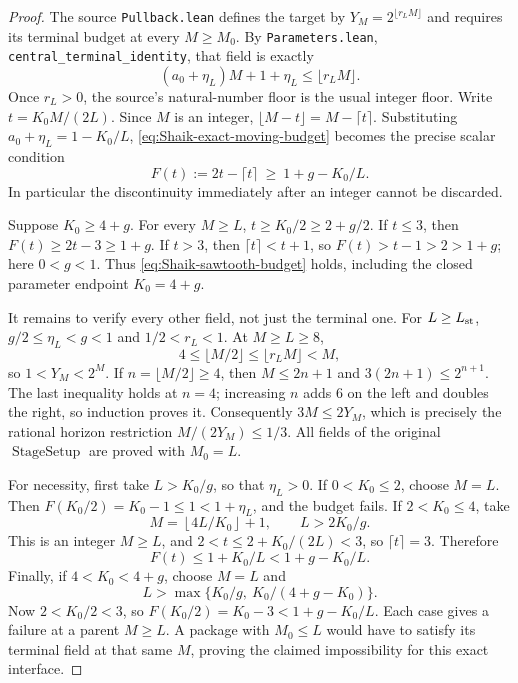 \begin{proof}
The source \texttt{Pullback.lean} defines the target by
\(Y_M=2^{\lfloor r_LM\rfloor}\) and requires its terminal budget
at every \(M\ge M_0\). By \texttt{Parameters.lean},
\texttt{central\_terminal\_identity}, that field is exactly
\begin{equation}\label{eq:Shaik-exact-moving-budget}
 (a_0+\eta_L)M+1+\eta_L\le\lfloor r_LM\rfloor .
\end{equation}
Once \(r_L>0\), the source's natural-number floor is the usual
integer floor. Write \(t=K_0M/(2L)\). Since \(M\) is an integer,
\(\lfloor M-t\rfloor=M-\lceil t\rceil\). Substituting
\(a_0+\eta_L=1-K_0/L\), \eqref{eq:Shaik-exact-moving-budget}
becomes the precise scalar condition
\begin{equation}\label{eq:Shaik-sawtooth-budget}
 F(t):=2t-\lceil t\rceil\ \ge\ 1+g-K_0/L.
\end{equation}
In particular the discontinuity immediately after an integer
cannot be discarded.

Suppose \(K_0\ge4+g\). For every \(M\ge L\),
\(t\ge K_0/2\ge2+g/2\). If \(t\le3\), then
\(F(t)\ge2t-3\ge1+g\). If \(t>3\), then
\(\lceil t\rceil<t+1\), so \(F(t)>t-1>2>1+g\);
here \(0<g<1\). Thus \eqref{eq:Shaik-sawtooth-budget}
holds, including the closed parameter endpoint \(K_0=4+g\).

It remains to verify every other field, not just the terminal one.
For \(L\ge L_{\rm st}\), \(g/2\le\eta_L<g<1\) and
\(1/2<r_L<1\). At \(M\ge L\ge8\),
\[
 4\le\lfloor M/2\rfloor\le\lfloor r_LM\rfloor<M,
\]
so \(1<Y_M<2^M\). If \(n=\lfloor M/2\rfloor\ge4\),
then \(M\le2n+1\) and \(3(2n+1)\le2^{n+1}\).
The last inequality holds at \(n=4\); increasing \(n\) adds \(6\)
on the left and doubles the right, so induction proves it.
Consequently \(3M\le2Y_M\), which is precisely the rational
horizon restriction \(M/(2Y_M)\le1/3\).
All fields of the original \(\operatorname{StageSetup}\) are proved
with \(M_0=L\).

For necessity, first take \(L>K_0/g\), so that \(\eta_L>0\).
If \(0<K_0\le2\), choose \(M=L\). Then
\(F(K_0/2)=K_0-1\le1<1+\eta_L\), and the budget fails.
If \(2<K_0\le4\), take
\[
 M=\left\lfloor4L/K_0\right\rfloor+1,\qquad L>2K_0/g.
\]
This is an integer \(M\ge L\), and
\(2<t\le2+K_0/(2L)<3\), so \(\lceil t\rceil=3\).
Therefore
\[
 F(t)\le1+K_0/L<1+g-K_0/L.
\]
Finally, if \(4<K_0<4+g\), choose \(M=L\) and
\[
 L>\max\{K_0/g,\ K_0/(4+g-K_0)\}.
\]
Now \(2<K_0/2<3\), so
\(F(K_0/2)=K_0-3<1+g-K_0/L\).
Each case gives a failure at a parent \(M\ge L\).
A package with \(M_0\le L\) would have to satisfy its terminal
field at that same \(M\), proving the claimed impossibility for
this exact interface.
\end{proof}

